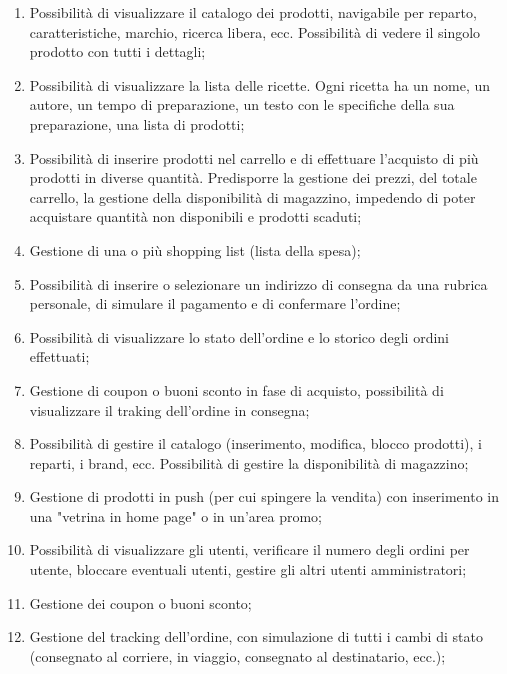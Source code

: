 \begin{enumerate}
	
	\item
	\label{f-up}
	Possibilità di visualizzare il catalogo dei prodotti, navigabile per reparto, caratteristiche, marchio, ricerca libera, ecc.
	Possibilità di vedere il singolo prodotto con tutti i dettagli;
	
	\item
	\label{ef-up}
	Possibilità di visualizzare la lista delle ricette. Ogni ricetta ha un nome, un autore, un tempo di preparazione, un testo con le specifiche della sua preparazione, una lista di prodotti;
	
	\item
	Possibilità di inserire prodotti nel carrello e di effettuare l'acquisto di più prodotti in diverse quantità.
	Predisporre la gestione dei prezzi, del totale carrello, la gestione della disponibilità di magazzino, impedendo di poter acquistare quantità non disponibili e prodotti scaduti;
	
	\item
	Gestione di una o più shopping list (lista della spesa);
	
	\item
	Possibilità di inserire o selezionare un indirizzo di consegna da una rubrica personale, di simulare il pagamento e di confermare l'ordine;
	
	\item
	Possibilità di visualizzare lo stato dell'ordine e lo storico degli ordini effettuati;
	
	\item
	\label{ef-ur}
	Gestione di coupon o buoni sconto in fase di acquisto, possibilità di visualizzare il traking dell'ordine in consegna;
	
	\item
	\label{sf-ua}
	Possibilità di gestire il catalogo (inserimento, modifica, blocco prodotti), i reparti, i brand, ecc.
	Possibilità di gestire la disponibilità di magazzino;
	
	\item
	Gestione di prodotti in push (per cui spingere la vendita) con inserimento in una "vetrina in home page" o in un'area promo;
	
	\item
	Possibilità di visualizzare gli utenti, verificare il numero degli ordini per utente, bloccare eventuali utenti, gestire gli altri utenti amministratori;
	
	\item
	Gestione dei coupon o buoni sconto;
	
	\item
	\label{ef-ua}
	Gestione del tracking dell'ordine, con simulazione di tutti i cambi di stato (consegnato al corriere, in viaggio, consegnato al destinatario, ecc.);
	
\end{enumerate}

